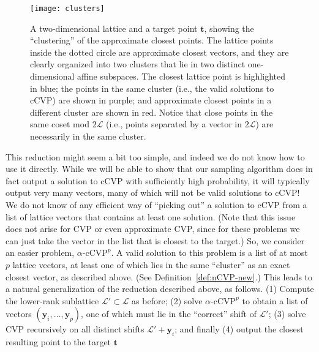 \documentclass[11pt]{article}
\renewcommand{\vec}[1]{\ensuremath{\mathbf{#1}}}
\newcommand{\problem}[1]{\mbox{#1}\xspace}
\newcommand{\scarequotes}[1]{``#1''}
\newcommand{\lat}{\mathcal{L}}
\begin{document}
\begin{figure}[ht]
\begin{center}
\texttt{[image: clusters]}
\caption{\label{fig:clusters} 
A two-dimensional lattice and a target point $\vec{t}$, showing the \scarequotes{clustering} of the approximate closest points. The lattice points inside the dotted circle are approximate closest vectors, and they are clearly organized into two clusters that lie in two distinct one-dimensional affine subspaces. The closest lattice point is highlighted in blue; the points in the same cluster (i.e., the valid solutions to cCVP) are shown in purple; and approximate closest points in a different cluster are shown in red. Notice that close points in the same coset mod $2\lat$ (i.e., points separated by a vector in $2\lat$) are necessarily in the same cluster.}
\end{center}
\end{figure}

This reduction might seem a bit too simple, and indeed we do not know how to use it directly. While we will be able to show that our sampling algorithm does in fact output a solution to cCVP with sufficiently high probability, it will typically output very many vectors, many of which will not be valid solutions to cCVP! We do not know of any efficient way of \scarequotes{picking out} a solution to cCVP from a list of lattice vectors that contains at least one solution. (Note that this issue does not arise for CVP or even approximate CVP, since for these problems we can just take the vector in the list that is closest to the target.) So, we consider an easier problem, $\alpha\text{-}\problem{cCVP}^p$. A valid solution to this problem is a list of at most $p$ lattice vectors, at least one of which lies in the same \scarequotes{cluster} as an exact closest vector, as described above.  (See Definition~\ref{def:nCVP-new}.) This leads to a natural generalization of the reduction described above, as follows. (1) Compute the lower-rank sublattice $\lat' \subset \lat$ as before; (2) solve $\alpha\text{-}\problem{cCVP}^p$ to obtain a list of vectors $(\vec{y}_i, \ldots, \vec{y}_p)$, one of which must lie in the \scarequotes{correct} shift of $\lat'$; (3) solve CVP recursively on all distinct shifts $\lat' + \vec{y}_i$; and finally (4) output the closest resulting point to the target $\vec{t}$
\end{document}
